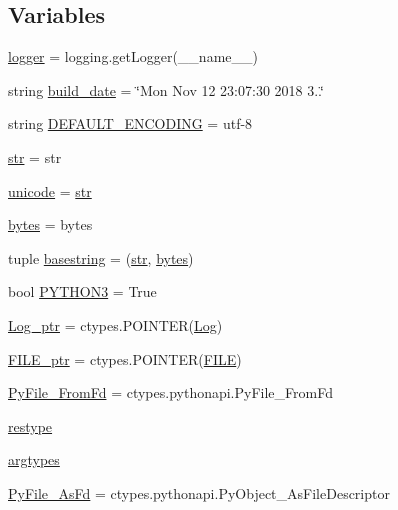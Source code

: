 \subsection*{Variables}
\begin{DoxyCompactItemize}
\item 
\hyperlink{namespacevlc_a0b14e488ae28d98d262453f3e9cd6e4d}{logger} = logging.\+get\+Logger(\+\_\+\+\_\+name\+\_\+\+\_\+)
\item 
string \hyperlink{namespacevlc_a9d9b637ad5b2c71a1a6464d5321dd702}{build\+\_\+date} = \char`\"{}Mon Nov 12 23\+:07\+:30 2018 3..\char`\"{}
\item 
string \hyperlink{namespacevlc_afe27f0e1c4864c0be1ff0061994415f2}{D\+E\+F\+A\+U\+L\+T\+\_\+\+E\+N\+C\+O\+D\+I\+NG} = \textquotesingle{}utf-\/8\textquotesingle{}
\item 
\hyperlink{namespacevlc_a4b99ff73a8a869319570237b5c57ab03}{str} = str
\item 
\hyperlink{namespacevlc_aa3c0e7a8f2695defce5d510420b4f347}{unicode} = \hyperlink{namespacevlc_a4b99ff73a8a869319570237b5c57ab03}{str}
\item 
\hyperlink{namespacevlc_ab5b288623cd78ddf5eeabe825d17a1c1}{bytes} = bytes
\item 
tuple \hyperlink{namespacevlc_a8a82bca121a0ad060450443ae990517d}{basestring} = (\hyperlink{namespacevlc_a4b99ff73a8a869319570237b5c57ab03}{str}, \hyperlink{namespacevlc_ab5b288623cd78ddf5eeabe825d17a1c1}{bytes})
\item 
bool \hyperlink{namespacevlc_a8d13049f8a8796da0124a57cec5d7738}{P\+Y\+T\+H\+O\+N3} = True
\item 
\hyperlink{namespacevlc_a6a30cabf154659a9b4616bc59bf46b22}{Log\+\_\+ptr} = ctypes.\+P\+O\+I\+N\+T\+ER(\hyperlink{classvlc_1_1_log}{Log})
\item 
\hyperlink{namespacevlc_ac4b5cdcbcf94f4dbe7eb3007f11fe7c0}{F\+I\+L\+E\+\_\+ptr} = ctypes.\+P\+O\+I\+N\+T\+ER(\hyperlink{classvlc_1_1_f_i_l_e}{F\+I\+LE})
\item 
\hyperlink{namespacevlc_af733ca8028b4ec8a35c42132b850f65b}{Py\+File\+\_\+\+From\+Fd} = ctypes.\+pythonapi.\+Py\+File\+\_\+\+From\+Fd
\item 
\hyperlink{namespacevlc_ab2283b4bbda0fbadaf5d9500e886ecbe}{restype}
\item 
\hyperlink{namespacevlc_a4ad1eb96239eecf8f075ae4c92adab5e}{argtypes}
\item 
\hyperlink{namespacevlc_aa8ee5f62a4363311eecbf26c79fd6556}{Py\+File\+\_\+\+As\+Fd} = ctypes.\+pythonapi.\+Py\+Object\+\_\+\+As\+File\+Descriptor

\end{DoxyCompactItemize}

